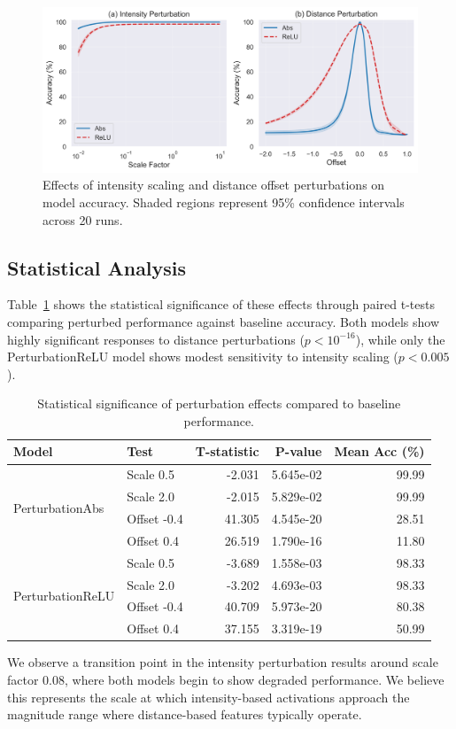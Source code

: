 \begin{figure}[h]
    \centering
    \includegraphics[width=\textwidth]{images/perturbation_analysis}
    \caption{Effects of intensity scaling and distance offset perturbations on model accuracy. Shaded regions represent 95\% confidence intervals across 20 runs.}
    \label{fig:perturbation_analysis}
    \end{figure}
\subsection{Statistical Analysis}

Table~\ref{tab:ttest} shows the statistical significance of these effects through paired t-tests comparing perturbed performance against baseline accuracy. Both models show highly significant responses to distance perturbations ($p < 10^{-16}$), while only the PerturbationReLU model shows modest sensitivity to intensity scaling ($p < 0.005$).

\begin{table}[h]
\centering
\begin{tabular}{llrrr}
\hline
Model & Test & T-statistic & P-value & Mean Acc (\%) \\
\hline
\multirow{4}{*}{PerturbationAbs} 
 & Scale 0.5 & -2.031 & 5.645e-02 & 99.99 \\
 & Scale 2.0 & -2.015 & 5.829e-02 & 99.99 \\
 & Offset -0.4 & 41.305 & 4.545e-20 & 28.51 \\
 & Offset 0.4 & 26.519 & 1.790e-16 & 11.80 \\
\hline
\multirow{4}{*}{PerturbationReLU}
 & Scale 0.5 & -3.689 & 1.558e-03 & 98.33 \\
 & Scale 2.0 & -3.202 & 4.693e-03 & 98.33 \\
 & Offset -0.4 & 40.709 & 5.973e-20 & 80.38 \\
 & Offset 0.4 & 37.155 & 3.319e-19 & 50.99 \\
\hline
\end{tabular}
\caption{Statistical significance of perturbation effects compared to baseline performance.}
\label{tab:ttest}
\end{table}

We observe a transition point in the intensity perturbation results around scale factor 0.08, where both models begin to show degraded performance. We believe this represents the scale at which intensity-based activations approach the magnitude range where distance-based features typically operate.
